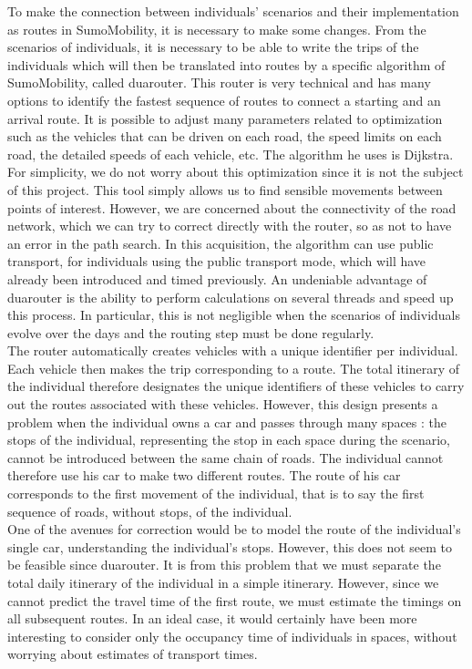 To make the connection between individuals' scenarios and their implementation as routes in SumoMobility, it is necessary to make some changes. From the scenarios of individuals, it is necessary to be able to write the trips of the individuals which will then be translated into routes by a specific algorithm of SumoMobility, called duarouter. This router is very technical and has many options to identify the fastest sequence of routes to connect a starting and an arrival route. It is possible to adjust many parameters related to optimization such as the vehicles that can be driven on each road, the speed limits on each road, the detailed speeds of each vehicle, etc. The algorithm he uses is Dijkstra. For simplicity, we do not worry about this optimization since it is not the subject of this project. This tool simply allows us to find sensible movements between points of interest. However, we are concerned about the connectivity of the road network, which we can try to correct directly with the router, so as not to have an error in the path search. In this acquisition, the algorithm can use public transport, for individuals using the public transport mode, which will have already been introduced and timed previously. An undeniable advantage of duarouter is the ability to perform calculations on several threads and speed up this process. In particular, this is not negligible when the scenarios of individuals evolve over the days and the routing step must be done regularly. \\

The router automatically creates vehicles with a unique identifier per individual. Each vehicle then makes the trip corresponding to a route. The total itinerary of the individual therefore designates the unique identifiers of these vehicles to carry out the routes associated with these vehicles. However, this design presents a problem when the individual owns a car and passes through many spaces : the stops of the individual, representing the stop in each space during the scenario, cannot be introduced between the same chain of roads. The individual cannot therefore use his car to make two different routes. The route of his car corresponds to the first movement of the individual, that is to say the first sequence of roads, without stops, of the individual.\\

One of the avenues for correction would be to model the route of the individual's single car, understanding the individual's stops. However, this does not seem to be feasible since duarouter. It is from this problem that we must separate the total daily itinerary of the individual in a simple itinerary. However, since we cannot predict the travel time of the first route, we must estimate the timings on all subsequent routes. In an ideal case, it would certainly have been more interesting to consider only the occupancy time of individuals in spaces, without worrying about estimates of transport times.\\

